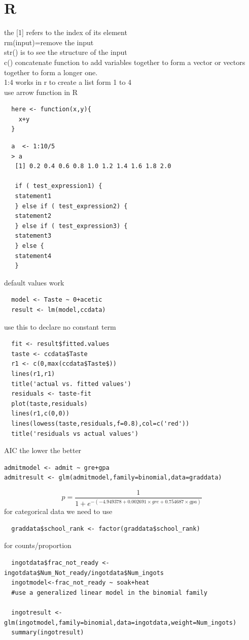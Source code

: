\documentclass{article}
\begin{document}
\section{R}
the [1] refers to the index of its element\\
rm(input)=remove the input\\
str() is to see the structure of the input\\
c() concatenate function to add variables together to form a vector or vectors together to form a longer one.\\
1:4 works in r to create a list form 1 to 4\\
use arrow function in R\\
\begin{verbatim}
  here <- function(x,y){
    x+y
  }
\end{verbatim}
\begin{verbatim}
  a  <- 1:10/5
  > a
   [1] 0.2 0.4 0.6 0.8 1.0 1.2 1.4 1.6 1.8 2.0

   if ( test_expression1) {
   statement1
   } else if ( test_expression2) {
   statement2
   } else if ( test_expression3) {
   statement3
   } else {
   statement4
   }
\end{verbatim}
default values work\\
\begin{verbatim}
  model <- Taste ~ 0+acetic
  result <- lm(model,ccdata)
\end{verbatim}
use this to declare no constant term\\
\begin{verbatim}
  fit <- result$fitted.values
  taste <- ccdata$Taste
  r1 <- c(0,max(ccdata$Taste$))
  lines(r1,r1)
  title('actual vs. fitted values')
  residuals <- taste-fit
  plot(taste,residuals)
  lines(r1,c(0,0))
  lines(lowess(taste,residuals,f=0.8),col=c('red'))
  title('residuals vs actual values')
\end{verbatim}
AIC the lower the better\\
\begin{verbatim}
admitmodel <- admit ~ gre+gpa
admitresult <- glm(admitmodel,family=binomial,data=graddata)
\end{verbatim}
$$
p=\frac{1}{1+e^{-(-4.949378+0.002691\times gre+0.754687\times gpa)}}
$$
for categorical data we need to use
\begin{verbatim}
  graddata$school_rank <- factor(graddata$school_rank)
\end{verbatim}
for counts/proportion\\
\begin{verbatim}
  ingotdata$frac_not_ready <- ingotdata$Num_Not_ready/ingotdata$Num_ingots
  ingotmodel<-frac_not_ready ~ soak+heat
  #use a generalized linear model in the binomial family

  ingotresult <- glm(ingotmodel,family=binomial,data=ingotdata,weight=Num_ingots)
  summary(ingotresult)

\end{verbatim}
\end{document}

